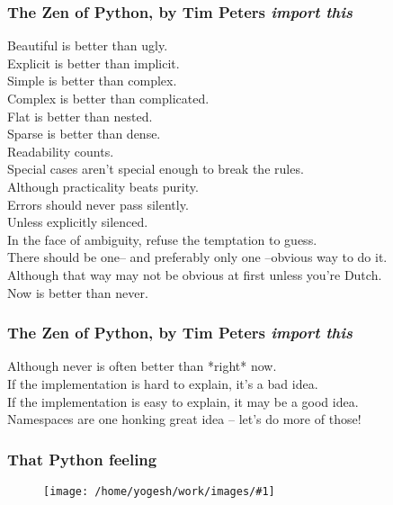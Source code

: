 \documentclass{beamer}
\newcommand{\bfr}{\begin{frame}}
\newcommand{\ft}[1]{\frametitle{#1}}
\newcommand{\myfig}[1]{\begin{figure} \texttt{[image: /home/yogesh/work/images/\#1]} \end{figure}}
\begin{document}
\bfr
\ft{The Zen of Python, by Tim Peters {\it import this}}
Beautiful is better than ugly.\\
Explicit is better than implicit.\\
Simple is better than complex.\\
Complex is better than complicated.\\
Flat is better than nested.\\
Sparse is better than dense.\\
Readability counts.\\
Special cases aren't special enough to break the rules.\\
Although practicality beats purity.\\
Errors should never pass silently.\\
Unless explicitly silenced.\\
In the face of ambiguity, refuse the temptation to guess.\\
There should be one-- and preferably only one --obvious way to do it.\\
Although that way may not be obvious at first unless you're Dutch.\\
Now is better than never.\\
\end{frame}

\bfr
\ft{The Zen of Python, by Tim Peters {\it import this}}
Although never is often better than *right* now.\\
If the implementation is hard to explain, it's a bad idea.\\
If the implementation is easy to explain, it may be a good idea.\\
Namespaces are one honking great idea -- let's do more of those!\\
\end{frame}

\bfr
\ft{That Python feeling}
\myfig{pythonflying.png}
\end{frame}
\end{document}
